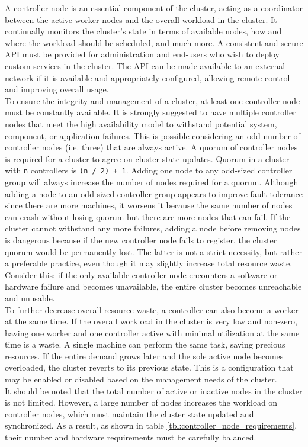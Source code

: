 A controller node is an essential component of the cluster, acting as a coordinator
between the active worker nodes and the overall workload in the cluster. It
continually monitors the cluster's state in terms of available nodes, how and where
the workload should be scheduled, and much more. A consistent and secure API must
be provided for administration and end-users who wish to deploy custom services in
the cluster. The API can be made available to an external network if it is
available and appropriately configured, allowing remote control and improving overall
usage. \\ %
To ensure the integrity and management of a cluster, at least one controller
node must be constantly available. It is strongly suggested to have multiple controller
nodes that meet the high availability model to withstand potential system,
component, or application failures. This is possible considering an odd number
of controller nodes (i.e. three) that are always active. A quorum of controller
nodes is required for a cluster to agree on cluster state updates. Quorum in a cluster
with \texttt{n} controllers is \texttt{(n / 2) + 1}. Adding one node to any odd-sized
controller group will always increase the number of nodes required for a quorum.
Although adding a node to an odd-sized controller group appears to improve fault
tolerance since there are more machines, it worsens it because the same number
of nodes can crash without losing quorum but there are more nodes that can fail.
If the cluster cannot withstand any more failures, adding a node before removing
nodes is dangerous because if the new controller node fails to register, the cluster
quorum would be permanently lost\cite{quorum}. The latter is not a strict necessity,
but rather a preferable practice, even though it may slightly increase total resource
waste. Consider this: if the only available controller node encounters a software
or hardware failure and becomes unavailable, the entire cluster becomes
unreachable and unusable.\\ %
To further decrease overall resource waste, a controller can also become a
worker at the same time. If the overall workload in the cluster is very low and non-zero,
having one worker and one controller active with minimal utilization at the same
time is a waste. A single machine can perform the same task, saving precious
resources. If the entire demand grows later and the sole active node becomes overloaded,
the cluster reverts to its previous state. This is a configuration that may be enabled
or disabled based on the management needs of the cluster. \\ %
It should be noted that the total number of active or inactive nodes in the cluster
is not limited. However, a large number of nodes increases the workload on controller
nodes, which must maintain the cluster state updated and synchronized. As a result,
as shown in table \ref{tbl:controller_node_requirements}\cite{k3s_large_clusters},
their number and hardware requirements must be carefully balanced.

